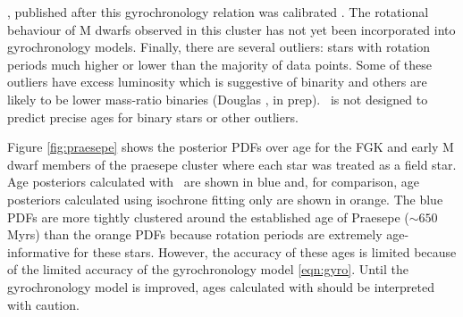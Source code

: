 \citep{douglas2017}, published after this gyrochronology relation was
calibrated \citet{angus2015}.
The rotational behaviour of M dwarfs observed in this cluster has not yet been
incorporated into gyrochronology models.
Finally, there are several outliers: stars with rotation periods much higher
or lower than the majority of data points.
Some of these outliers have excess luminosity which is suggestive of binarity
and others are likely to be lower mass-ratio binaries (Douglas \etal, in prep).
\sd\ is not designed to predict precise ages for binary stars or other
outliers.

Figure \ref{fig:praesepe} shows the posterior PDFs over age for the FGK and
early M dwarf members of the praesepe cluster where each star was treated as a
field star.
Age posteriors calculated with \sd\ are shown in blue and, for comparison, age
posteriors calculated using isochrone fitting only are shown in orange.
The blue PDFs are more tightly clustered around the established age of
Praesepe ($\sim650$Myrs) than the orange PDFs because rotation periods are
extremely age-informative for these stars.
However, the accuracy of these ages is limited because of the limited accuracy
of the gyrochronology model \ref{eqn:gyro}.
Until the gyrochronology model is improved, ages calculated with \sd should be
interpreted with caution.


